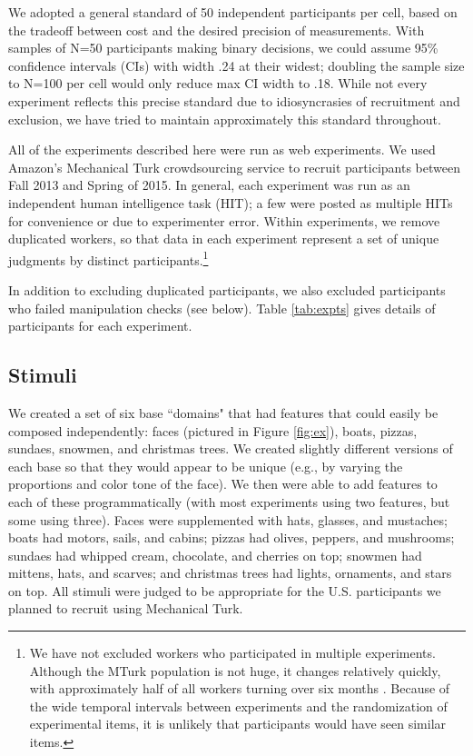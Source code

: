 \documentclass[man]{apa6}
\begin{document}
We adopted a general standard of 50 independent participants per cell, based on the tradeoff between cost and the desired precision of measurements. With samples of N=50 participants making binary decisions, we could assume 95\% confidence intervals (CIs) with width .24 at their widest; doubling the sample size to N=100 per cell would only reduce max CI width to .18. While not every experiment reflects this precise standard due to idiosyncrasies of recruitment and exclusion, we have tried to maintain approximately this standard throughout.

All of the experiments described here were run as web experiments. We used Amazon's Mechanical Turk crowdsourcing service to recruit participants between Fall 2013 and Spring of 2015. In general, each experiment was run as an independent human intelligence task (HIT); a few were posted as multiple HITs for convenience or due to experimenter error. Within experiments, we remove duplicated workers, so that data in each experiment represent a set of unique judgments by distinct participants.\footnote{We have not excluded workers who participated in multiple experiments. Although the MTurk population is not huge, it changes relatively quickly, with approximately half of all workers turning over six months \cite{stewart2015}. Because of the wide temporal intervals between experiments and the randomization of experimental items, it is unlikely that participants would have seen similar items.}

In addition to excluding duplicated participants, we also excluded participants who failed manipulation checks (see below). Table \ref{tab:expts} gives details of participants for each experiment.

\subsection{Stimuli}

We created a set of six base ``domains" that had features that could easily be composed independently: faces (pictured in Figure \ref{fig:ex}), boats, pizzas, sundaes, snowmen, and christmas trees. We created slightly different versions of each base so that they would appear to be unique (e.g., by varying the proportions and color tone of the face). We then were able to add features to each of these programmatically (with most experiments using two features, but some using three). Faces were supplemented with hats, glasses, and mustaches; boats had motors, sails, and cabins; pizzas had olives, peppers, and mushrooms; sundaes had whipped cream, chocolate, and cherries on top; snowmen had mittens, hats, and scarves; and christmas trees had lights, ornaments, and stars on top. All stimuli were judged to be appropriate for the U.S. participants we planned to recruit using Mechanical Turk.
\end{document}
